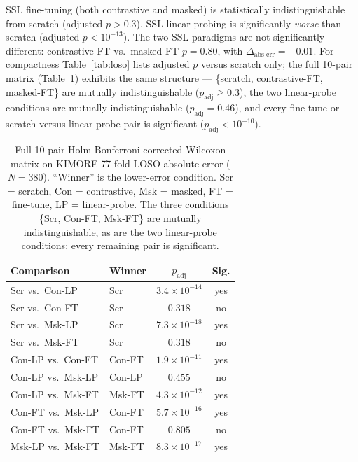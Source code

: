 \documentclass[10pt,journal]{IEEEtran}
\begin{document}
SSL fine-tuning (both contrastive and masked) is statistically indistinguishable from scratch (adjusted $p > 0.3$). SSL linear-probing is significantly \emph{worse} than scratch (adjusted $p < 10^{-13}$). The two SSL paradigms are not significantly different: contrastive FT vs.\ masked FT $p = 0.80$, with $\Delta_{\text{abs-err}} = -0.01$. For compactness Table~\ref{tab:loso} lists adjusted $p$ versus scratch only; the full 10-pair matrix (Table~\ref{tab:pairwise-full}) exhibits the same structure --- \{scratch, contrastive-FT, masked-FT\} are mutually indistinguishable ($p_{\text{adj}} \geq 0.3$), the two linear-probe conditions are mutually indistinguishable ($p_{\text{adj}} = 0.46$), and every fine-tune-or-scratch versus linear-probe pair is significant ($p_{\text{adj}} < 10^{-10}$).

\begin{table}[t]
\centering
\footnotesize
\setlength{\tabcolsep}{4pt}
\caption{Full 10-pair Holm-Bonferroni-corrected Wilcoxon matrix on KIMORE 77-fold LOSO absolute error ($N=380$). ``Winner'' is the lower-error condition. Scr = scratch, Con = contrastive, Msk = masked, FT = fine-tune, LP = linear-probe. The three conditions \{Scr, Con-FT, Msk-FT\} are mutually indistinguishable, as are the two linear-probe conditions; every remaining pair is significant.}
\label{tab:pairwise-full}
\begin{tabular}{llcc}
\toprule
Comparison & Winner & $p_{\text{adj}}$ & Sig. \\
\midrule
Scr vs.\ Con-LP    & Scr    & $3.4\times10^{-14}$ & yes \\
Scr vs.\ Con-FT    & Scr    & $0.318$             & no  \\
Scr vs.\ Msk-LP    & Scr    & $7.3\times10^{-18}$ & yes \\
Scr vs.\ Msk-FT    & Scr    & $0.318$             & no  \\
Con-LP vs.\ Con-FT & Con-FT & $1.9\times10^{-11}$ & yes \\
Con-LP vs.\ Msk-LP & Con-LP & $0.455$             & no  \\
Con-LP vs.\ Msk-FT & Msk-FT & $4.3\times10^{-12}$ & yes \\
Con-FT vs.\ Msk-LP & Con-FT & $5.7\times10^{-16}$ & yes \\
Con-FT vs.\ Msk-FT & Con-FT & $0.805$             & no  \\
Msk-LP vs.\ Msk-FT & Msk-FT & $8.3\times10^{-17}$ & yes \\
\bottomrule
\end{tabular}
\end{table}
\end{document}
